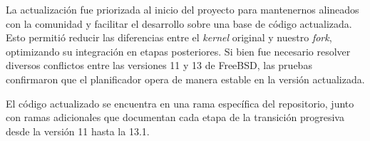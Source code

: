 La actualización fue priorizada al inicio del proyecto para mantenernos alineados con la comunidad y facilitar el desarrollo sobre una base de código actualizada. Esto permitió reducir las diferencias entre el \textit{kernel} original y nuestro \textit{fork}, optimizando su integración en etapas posteriores. Si bien fue necesario resolver diversos conflictos entre las versiones 11 y 13 de FreeBSD, las pruebas confirmaron que el planificador opera de manera estable en la versión actualizada.\par

El código actualizado se encuentra en una rama específica del repositorio, junto con ramas adicionales que documentan cada etapa de la transición progresiva desde la versión 11 hasta la 13.1.\par

